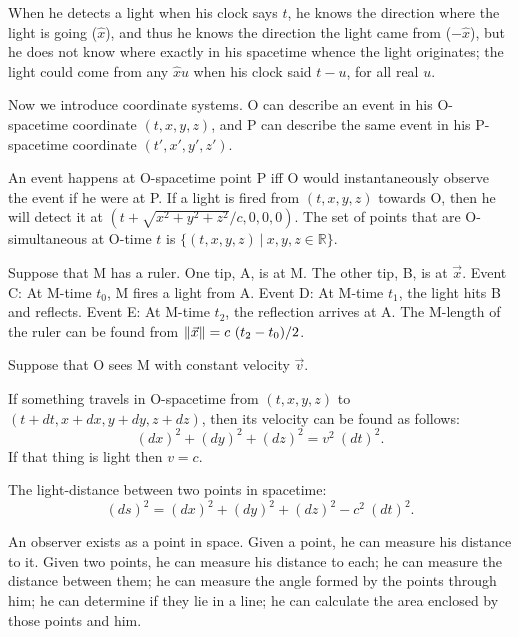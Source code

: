 When he detects a light when his clock says $t$,
he knows the direction where the light is going ($\hat{x}$),
and thus he knows the direction the light came from ($-\hat{x}$),
but he does not know where exactly in his spacetime whence the light originates;
the light could come from any $\hat{x}u$ when his clock said $t-u$, for all real $u$.

Now we introduce coordinate systems.
O can describe an event in his O-spacetime coordinate $(t,x,y,z)$,
and P can describe the same event in his P-spacetime coordinate $(t',x',y',z')$.

An event happens at O-spacetime point P iff
O would instantaneously observe the event if he were at P.
If a light is fired from $(t,x,y,z)$ towards O,
then he will detect it at $(t+\sqrt{x^2+y^2+z^2}/c,0,0,0)$.
The set of points that are O-simultaneous at O-time $t$ is $\{(t,x,y,z) ~|~ x,y,z\in\mathbb{R}\}$.

Suppose that M has a ruler.
One tip, A, is at M.
The other tip, B, is at $\vec{x}$.
Event C: At M-time $t_0$, M fires a light from A.
Event D: At M-time $t_1$, the light hits B and reflects.
Event E: At M-time $t_2$, the reflection arrives at A.
The M-length of the ruler can be found from $\norm{\vec{x}} = c~(t_2-t_0)/2$.

Suppose that O sees M with constant velocity $\vec{v}$.


If something travels in O-spacetime from $(t,x,y,z)$ to $(t+dt,x+dx,y+dy,z+dz)$,
then its velocity can be found as follows:
\[
(dx)^2 + (dy)^2 + (dz)^2 = v^2~(dt)^2.
\]
If that thing is light then $v=c$.

The light-distance between two points in spacetime:
\[
(ds)^2 = (dx)^2 + (dy)^2 + (dz)^2 - c^2~(dt)^2.
\]

An observer exists as a point in space.
Given a point, he can measure his distance to it.
Given two points, he can measure his distance to each;
he can measure the distance between them;
he can measure the angle formed by the points through him;
he can determine if they lie in a line;
he can calculate the area enclosed by those points and him.



